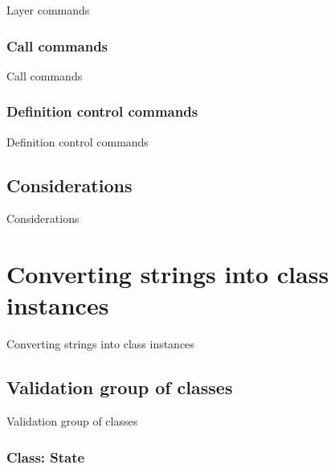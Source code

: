 \documentclass[11pt,twoside,openany,x11names,svgnames]{memoir}
\begin{document}
Layer commands

\subsubsection{Call commands}\label{Call-commands}

Call commands

\subsubsection{Definition control commands}\label{Definition-control-commands}

Definition control commands

\subsection{Considerations}\label{Considerations2}

Considerations

\section{Converting strings into class instances}\label{Converting-strings-into-class-instances}

Converting strings into class instances

\subsection{Validation group of classes}\label{Validation-group-of-classes}

Validation group of classes

\subsubsection{Class: State}\label{Class-State}
\end{document}
